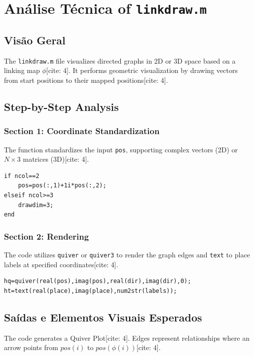 
\chapter{Análise Técnica of \texttt{linkdraw.m}}
\date{March 10, 2026}


\section{Visão Geral}
The \texttt{linkdraw.m} file visualizes directed graphs in 2D or 3D space based on a linking map $\phi$[cite: 4]. It performs geometric visualization by drawing vectors from start positions to their mapped positions[cite: 4].

\section{Step-by-Step Analysis}

\subsection{Section 1: Coordinate Standardization}
The function standardizes the input \texttt{pos}, supporting complex vectors (2D) or $N \times 3$ matrices (3D)[cite: 4].
\begin{lstlisting}
if ncol==2 
    pos=pos(:,1)+1i*pos(:,2);
elseif ncol>=3 
    drawdim=3; 
end
\end{lstlisting}

\subsection{Section 2: Rendering}
The code utilizes \texttt{quiver} or \texttt{quiver3} to render the graph edges and \texttt{text} to place labels at specified coordinates[cite: 4].
\begin{lstlisting}
hq=quiver(real(pos),imag(pos),real(dir),imag(dir),0);
ht=text(real(place),imag(place),num2str(labels));
\end{lstlisting}

\section{Saídas e Elementos Visuais Esperados}
The code generates a Quiver Plot[cite: 4]. Edges represent relationships where an arrow points from $pos(i)$ to $pos(\phi(i))$[cite: 4].
